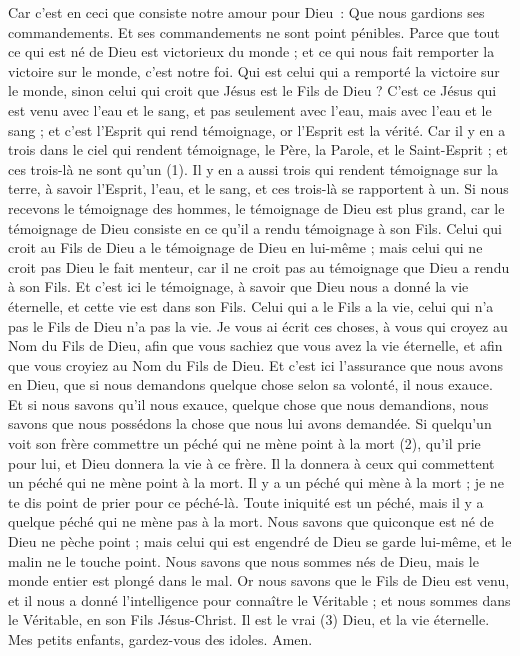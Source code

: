\begin{multicols}{2}
Car c'est en ceci que consiste notre amour pour Dieu : Que nous gardions ses commandements. Et ses commandements ne sont point pénibles.
Parce que tout ce qui est né de Dieu est victorieux du monde ; et ce qui nous fait remporter la victoire sur le monde, c'est notre foi.
Qui est celui qui a remporté la victoire sur le monde, sinon celui qui croit que Jésus est le Fils de Dieu ?
C'est ce Jésus qui est venu avec l’eau et le sang, et pas seulement avec l'eau, mais avec l'eau et le sang ; et c'est l'Esprit qui rend témoignage, or l'Esprit est la vérité.
Car il y en a trois dans le ciel qui rendent témoignage, le Père, la Parole, et le Saint-Esprit ; et ces trois-là ne sont qu'un (1).
Il y en a aussi trois qui rendent témoignage sur la terre, à savoir l'Esprit, l'eau, et le sang, et ces trois-là se rapportent à un.
Si nous recevons le témoignage des hommes, le témoignage de Dieu est plus grand, car le témoignage de Dieu consiste en ce qu’il a rendu témoignage à son Fils.
Celui qui croit au Fils de Dieu a le témoignage de Dieu en lui-même ; mais celui qui ne croit pas Dieu le fait menteur, car il ne croit pas au témoignage que Dieu a rendu à son Fils.
Et c'est ici le témoignage, à savoir que Dieu nous a donné la vie éternelle, et cette vie est dans son Fils.
Celui qui a le Fils a la vie, celui qui n'a pas le Fils de Dieu n'a pas la vie.
Je vous ai écrit ces choses, à vous qui croyez au Nom du Fils de Dieu, afin que vous sachiez que vous avez la vie éternelle, et afin que vous croyiez au Nom du Fils de Dieu.
Et c'est ici l’assurance que nous avons en Dieu, que si nous demandons quelque chose selon sa volonté, il nous exauce.
Et si nous savons qu'il nous exauce, quelque chose que nous demandions, nous savons que nous possédons la chose que nous lui avons demandée.
Si quelqu'un voit son frère commettre un péché qui ne mène point à la mort (2), qu’il prie pour lui, et Dieu donnera la vie à ce frère. Il la donnera à ceux qui commettent un péché qui ne mène point à la mort. Il y a un péché qui mène à la mort ; je ne te dis point de prier pour ce péché-là.
Toute iniquité est un péché, mais il y a quelque péché qui ne mène pas à la mort.
Nous savons que quiconque est né de Dieu ne pèche point ; mais celui qui est engendré de Dieu se garde lui-même, et le malin ne le touche point.
Nous savons que nous sommes nés de Dieu, mais le monde entier est plongé dans le mal.
Or nous savons que le Fils de Dieu est venu, et il nous a donné l'intelligence pour connaître le Véritable ; et nous sommes dans le Véritable, en son Fils Jésus-Christ. Il est le vrai (3) Dieu, et la vie éternelle.
Mes petits enfants, gardez-vous des idoles. Amen.
\PPE{}
\end{multicols}
